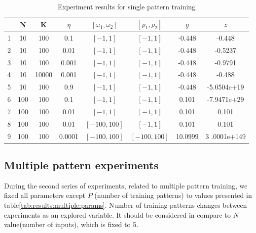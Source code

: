 \documentclass{classrep}
\begin{document}
{{            \begin{table}[!htbp]
                \centering
                \begin{tabular}{|c|c|c|c|c|c|c|c|}
                    \hline
                    & N & K & $\eta$ & $[\omega_{1}, \omega_{2}]$ & $[\rho_{1},
                    \rho_{2}]$ & $y$ & $z$ \\ \hline
                    1 & 10 & 100 & 0.1 & $[-1,1]$ & $[-1,1]$ & -0.448 & -0.448 \\ \hline
                    2 & 10 & 100 & 0.01 & $[-1,1]$ & $[-1,1]$ & -0.448 & -0.5237 \\ \hline
                    3 & 10 & 100 & 0.001 & $[-1,1]$ & $[-1,1]$ & -0.448 & -0.9791 \\
                    \hline
                    4 & 10 & 10000 & 0.001 & $[-1,1]$ & $[-1,1]$ & -0.448 & -0.488 \\
                    \hline
                    5 & 10 & 100 & 0.9 & $[-1,1]$ & $[-1,1]$ & -0.448 & -5.0504e+19 \\
                    \hline
                    6 & 100 & 100 & 0.1 & $[-1,1]$ & $[-1,1]$ & 0.101 & -7.9471e+29 \\
                    \hline
                    7 & 100 & 100 & 0.01 & $[-1,1]$ & $[-1,1]$ & 0.101 & 0.101 \\ \hline
                    8 & 100 & 100 & 0.01 & $[-100,100]$ & $[-1,1]$ & 0.101 & 0.101 \\
                    \hline
                    9 & 100 & 100 & 0.0001 & $[-100,100]$ & $[-100,100]$ & 10.0999 & 3
                    .0001e+149 \\ \hline
                \end{tabular}
                \caption{Experiment results for single pattern training}
                \label{tab:results:single}
            \end{table}
            \FloatBarrier
        }

        \subsection{Multiple pattern experiments}
        \label{results:multiple} {
            During the second series of experiments, related to multiple pattern
            training, we fixed all parameters except $P$ (number of training patterns)
            to values presented in table\ref{tab:results:multiple:params}. Number of
            training patterns changes between experiments as an explored variable. It
            should be considered in compare to $N$ value(number of inputs), which is
            fixed to 5.

}}
\end{document}
